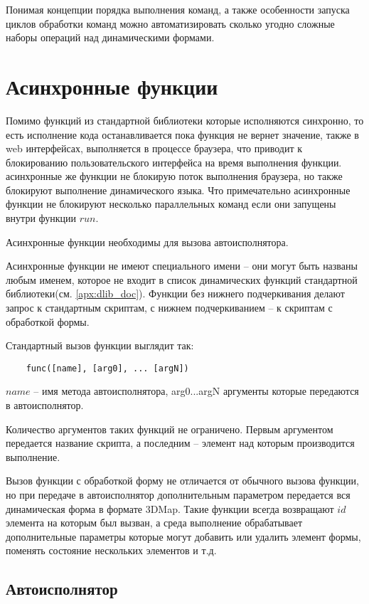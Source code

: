 \documentclass[../index.tex]{subfiles}
\begin{document}
Понимая концепции порядка выполнения команд, а также особенности запуска циклов обработки команд можно автоматизировать сколько угодно сложные наборы операций над динамическими формами.

\label{sec:async}
\section{Асинхронные функции}

Помимо функций из стандартной библиотеки которые исполняются синхронно, 
то есть исполнение кода останавливается пока функция не вернет значение, также 
в web интерфейсах, выполняется в процессе браузера, что приводит к блокированию 
пользовательского интерфейса на время выполнения функции.
асинхронные же функции не блокирую поток выполнения браузера, но также блокируют 
выполнение динамического языка. Что примечательно асинхронные функции не блокируют
несколько параллельных команд если они запущены внутри функции $run$.

Асинхронные функции необходимы для вызова автоисполнятора.

Асинхронные функции не имеют специального имени -- они могут быть названы любым именем, которое не входит в список динамических функций стандартной библиотеки(см. \autoref{apx:dlib_doc}).
Функции без нижнего подчеркивания делают запрос к стандартным скриптам, с нижнем подчеркиванием -- 
к скриптам с обработкой формы.

Стандартный вызов функции выглядит так:
\begin{verbatim}
    func([name], [arg0], ... [argN])
\end{verbatim}

$name$ -- имя метода автоисполнятора, arg0...argN аргументы которые передаются в автоисполнятор.

Количество аргументов таких функций не ограничено. Первым аргументом передается название скрипта, 
а последним -- элемент над которым производится выполнение.

Вызов функции с обработкой форму не отличается от обычного вызова функции, но при передаче в автоисполнятор
дополнительным параметром передается вся динамическая форма в формате 3DMap. 
Такие функции всегда возвращают $id$ элемента на которым был вызван, а среда выполнение обрабатывает 
дополнительные параметры которые могут добавить или удалить элемент формы, поменять состояние нескольких элементов
и т.д.  

\subsection{Автоисполнятор}\label{autoexec}
\end{document}
